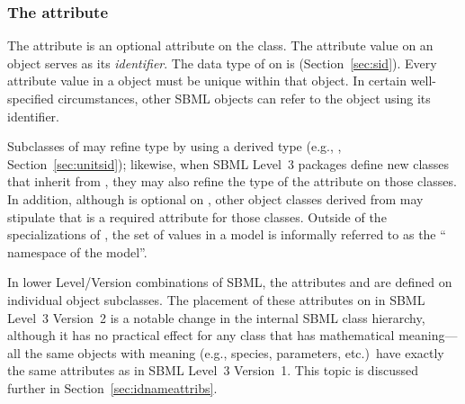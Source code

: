 \begin{blockChanged}

\subsubsection{The  attribute}
\label{sec:sbase-id}

The  attribute is an optional attribute on the \SBase class.  The  attribute value on an object serves as its \emph{identifier}.  The data type of  on \SBase is  (Section~\ref{sec:sid}).  Every  attribute value in a \Model object must be unique within that \Model object.  In certain well-specified circumstances, other SBML objects can refer to the object using its identifier.

Subclasses of \SBase may refine type  by using a derived type (e.g., , Section~\ref{sec:unitsid}); likewise, when SBML Level~3 packages define new classes that inherit from \SBase, they may also refine the type of the  attribute on those classes.  In addition, although  is optional on \SBase, other object classes derived from \SBase may stipulate that  is a required attribute for those classes.  Outside of the specializations of , the set of  values in a model is informally referred to as the `` namespace of the model''.

In lower Level/Version combinations of SBML, the attributes  and  are defined on individual object subclasses.  The placement of these attributes on \SBase in SBML Level~3 Version~2 is a notable change in the internal SBML class hierarchy, although it has no practical effect for any class that has mathematical meaning---all the same objects with meaning (e.g., species, parameters, etc.)\ have exactly the same  attributes as in SBML Level~3 Version~1.  This topic is discussed further in Section~\ref{sec:idnameattribs}.


\label{sec:sbase-name}


\end{blockChanged}
